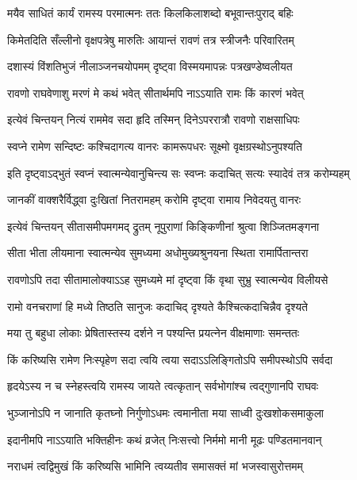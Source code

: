 \twolineshloka
{मयैव साधितं कार्यं रामस्य परमात्मनः}
{ततः किलकिलाशब्दो बभूवान्तःपुराद् बहिः} %

\twolineshloka
{किमेतदिति सँल्लीनो वृक्षपत्रेषु मारुतिः}
{आयान्तं रावणं तत्र स्त्रीजनैः परिवारितम्} %

\twolineshloka
{दशास्यं विंशतिभुजं नीलाञ्जनचयोपमम्}
{दृष्ट्वा विस्मयमापन्नः पत्रखण्डेष्वलीयत} %

\twolineshloka
{रावणो राघवेणाशु मरणं मे कथं भवेत्}
{सीतार्थमपि नाऽऽयाति रामः किं कारणं भवेत्} %

\twolineshloka
{इत्येवं चिन्तयन् नित्यं राममेव सदा हृदि}
{तस्मिन् दिनेऽपररात्रौ रावणो राक्षसाधिपः} %

\twolineshloka
{स्वप्ने रामेण सन्दिष्टः कश्चिदागत्य वानरः}
{कामरूपधरः सूक्ष्मो वृक्षग्रस्थोऽनुपश्यति} %

\twolineshloka
{इति दृष्ट्वाऽद्भुतं स्वप्नं स्वात्मन्येवानुचिन्त्य सः}
{स्वप्नः कदाचित् सत्यः स्यादेवं तत्र करोम्यहम्} %

\twolineshloka
{जानकीं वाक्शरैर्विद्ध्वा दुःखितां नितरामहम्}
{करोमि दृष्ट्वा रामाय निवेदयतु वानरः} %

\twolineshloka
{इत्येवं चिन्तयन् सीतासमीपमगमद् द्रुतम्}
{नूपुराणां किङ्किणीनां श्रुत्वा शिञ्जितमङ्गना} %

\twolineshloka
{सीता भीता लीयमाना स्वात्मन्येव सुमध्यमा}
{अधोमुख्यश्रुनयना स्थिता रामार्पितान्तरा} %

\twolineshloka
{रावणोऽपि तदा सीतामालोक्याऽऽह सुमध्यमे}
{मां दृष्ट्वा किं वृथा सुभ्रु स्वात्मन्येव विलीयसे} %

\twolineshloka
{रामो वनचराणां हि मध्ये तिष्ठति सानुजः}
{कदाचिद् दृश्यते कैश्चित्कदाचिन्नैव दृश्यते} %

\twolineshloka
{मया तु बहुधा लोकाः प्रेषितास्तस्य दर्शने}
{न पश्यन्ति प्रयत्नेन वीक्षमाणाः समन्ततः} %

\twolineshloka
{किं करिष्यसि रामेण निःस्पृहेण सदा त्वयि}
{त्वया सदाऽऽलिङ्गितोऽपि समीपस्थोऽपि सर्वदा} %

\twolineshloka
{हृदयेऽस्य न च स्नेहस्त्वयि रामस्य जायते}
{त्वत्कृतान् सर्वभोगांश्च त्वद्गुणानपि राघवः} %

\twolineshloka
{भुञ्जानोऽपि न जानाति कृतघ्नो निर्गुणोऽधमः}
{त्वमानीता मया साध्वी दुःखशोकसमाकुला} %

\twolineshloka
{इदानीमपि नाऽऽयाति भक्तिहीनः कथं व्रजेत्}
{निःसत्त्वो निर्ममो मानी मूढः पण्डितमानवान्} %

\twolineshloka
{नराधमं त्वद्विमुखं किं करिष्यसि भामिनि}
{त्वय्यतीव समासक्तं मां भजस्वासुरोत्तमम्} %


